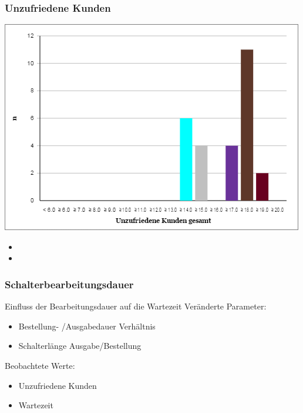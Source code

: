 \documentclass{beamer}
\begin{document}
\begin{frame}
	\frametitle{Unzufriedene Kunden } %
  	\includegraphics[width=\textwidth, height=0.85\textheight]{./Kundenunzu.png}
 	\begin{itemize}
 		\item[]
 		\item[]
 	\end{itemize}
\end{frame}

\begin{frame} %
  \frametitle{Schalterbearbeitungsdauer} %
  Einfluss der Bearbeitungsdauer auf die Wartezeit\newline
  Veränderte Parameter:
  \begin{itemize}
  	\item Bestellung- /Ausgabedauer Verhältnis 
  	\item Schalterlänge Ausgabe/Bestellung
  \end{itemize}
  Beobachtete Werte: %
  \begin{itemize}
  	\item Unzufriedene Kunden %
  	\item Wartezeit %
  
  \end{itemize}
\end{frame}
\end{document}
